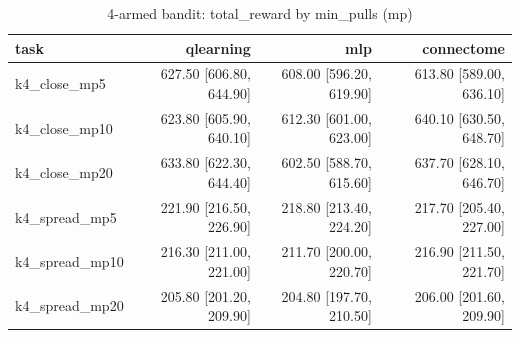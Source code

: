 \begin{table}[t]
\centering
\small
\begin{tabular}{lrrr}
\toprule
task & qlearning & mlp & connectome \\
\midrule
k4\_close\_mp5 & 627.50 [606.80, 644.90] & 608.00 [596.20, 619.90] & 613.80 [589.00, 636.10] \\
k4\_close\_mp10 & 623.80 [605.90, 640.10] & 612.30 [601.00, 623.00] & 640.10 [630.50, 648.70] \\
k4\_close\_mp20 & 633.80 [622.30, 644.40] & 602.50 [588.70, 615.60] & 637.70 [628.10, 646.70] \\
k4\_spread\_mp5 & 221.90 [216.50, 226.90] & 218.80 [213.40, 224.20] & 217.70 [205.40, 227.00] \\
k4\_spread\_mp10 & 216.30 [211.00, 221.00] & 211.70 [200.00, 220.70] & 216.90 [211.50, 221.70] \\
k4\_spread\_mp20 & 205.80 [201.20, 209.90] & 204.80 [197.70, 210.50] & 206.00 [201.60, 209.90] \\
\bottomrule
\end{tabular}
\caption{4-armed bandit: total\_reward by min\_pulls (mp)}
\label{tab:bandit_multi_total_reward}
\end{table}